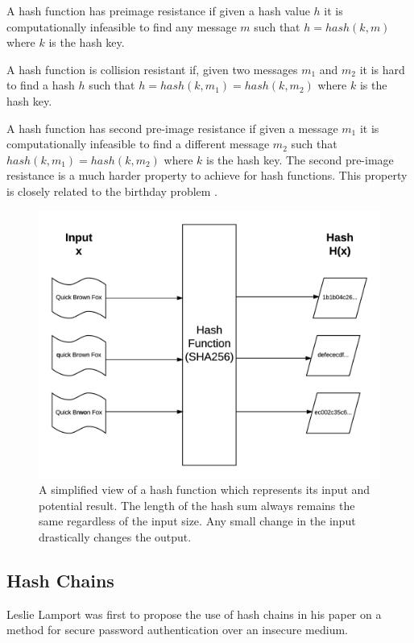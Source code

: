 \documentclass[12pt,conference]{IEEEtran}
\begin{document}
A hash function has preimage resistance if given a hash value $h$ it is computationally infeasible to find any message $m$ such that $h = hash(k,m)$ where $k$ is the hash key.

A hash function is collision resistant if, given two messages $m_{1}$ and $m_{2}$ it is hard to find a hash $h$ such that $h = hash(k,m_{1}) = hash(k,m_{2})$ where $k$ is the hash key.

A hash function has second pre-image resistance if given a message $m_{1}$ it is computationally infeasible to find a different message  $m_{2}$ such that $hash(k,m_{1}) = hash(k,m_{2})$ where $k$ is the hash key. The second pre-image resistance is a much harder property to achieve for hash functions. This property is closely related to the birthday problem \cite{lesser_exploring_1999}.

\begin{figure}[hbtp]
\includegraphics[scale=0.58]{hash_function.png}
\caption{A simplified view of a hash function which represents its input and potential result. The length of the hash sum always remains the same regardless of the input size. Any small change in the input drastically changes the output.}
\end{figure}


\subsection*{Hash Chains \cite{horne_hash_2011}}

Leslie Lamport \cite{lamport_password_1981} was first to propose the use of hash chains in his paper on a method for secure password authentication over an insecure medium.
\end{document}

